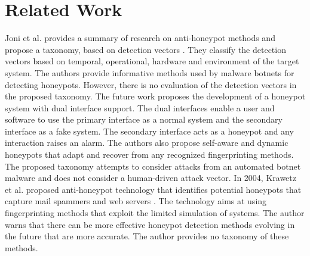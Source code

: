 \section{Related Work}
\label{sec:rw}

Joni et al. provides a  summary of research on anti-honeypot methods and propose a taxonomy, based on detection vectors \cite{Joni}. They classify the detection vectors based on temporal, operational, hardware and environment of the target system. The authors provide informative methods used by malware botnets for detecting honeypots. However, there is no evaluation of the detection vectors in the proposed taxonomy. The future work proposes the development of a honeypot system with dual interface support. The dual interfaces enable a user and software to use the primary interface as a normal system and the secondary interface as a fake system. The secondary interface acts as a honeypot and any interaction raises an alarm. The authors also propose self-aware and dynamic honeypots that adapt and recover from any recognized fingerprinting methods. The proposed taxonomy attempts to consider attacks from an automated botnet malware and does not consider a human-driven attack vector. In 2004, Krawetz et al.  proposed anti-honeypot technology that identifies potential honeypots that capture mail spammers and web servers \cite{krawetz2004anti}. The technology aims at using fingerprinting methods that exploit the limited simulation of systems. The author warns that there can be more effective honeypot detection methods evolving in the future that are more accurate. The author provides no taxonomy of these methods. 
